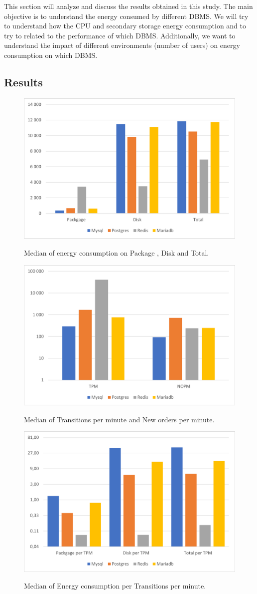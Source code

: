 This section will analyze and discuss the results obtained in this study. 
The main objective is to understand the energy consumed by different DBMS.
 We will try to understand how the CPU and secondary storage energy consumption and to try to related to the performance of which DBMS. Additionally, we want to understand the impact of different environments (number of users) on energy consumption on which DBMS.
 \subsection{Results}
 
 

\begin{figure}[h]
\centering
\caption{Median of energy consumption on Package , Disk and Total.}
\includegraphics[width=0.6\columnwidth]{results/median/energy.png}
\label{fig:medianenergy}
\end{figure}

\begin{figure}[h]
\centering
\caption{Median of Transitions per minute and New orders per minute.}
\includegraphics[width=0.6\columnwidth]{results/median/hammerdb.png}
\label{fig:medianhammerdb}
\end{figure}


\begin{figure}[h!]
\centering
\caption{Median of Energy consumption per Transitions per minute.}
\includegraphics[width=0.6\columnwidth]{results/median/energy-tpm.png}
\label{fig:medianenergyhammerdb}	
\end{figure}   

